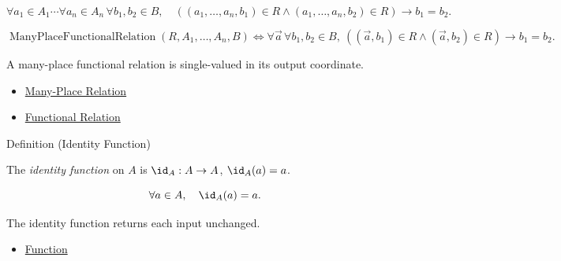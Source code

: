 \begin{remark*}
\[
  \forall a_1\in A_1\cdots\forall a_n\in A_n\,\forall b_1,b_2\in B,\quad
  ((a_1,\ldots,a_n,b_1)\in R\wedge(a_1,\ldots,a_n,b_2)\in R)\to b_1=b_2.
\]
\end{remark*}

\begin{remark*}
\[
  \operatorname{ManyPlaceFunctionalRelation}(R,A_1,\ldots,A_n,B)
  \iff
  \forall \vec a\,\forall b_1,b_2\in B,\
  ((\vec a,b_1)\in R\wedge(\vec a,b_2)\in R)\to b_1=b_2.
\]
\end{remark*}

\begin{remark*}[Interpretation]
A many-place functional relation is single-valued in its output coordinate.
\end{remark*}

\begin{dependencies}
\begin{itemize}
  \item \hyperref[def:many-place-relation]{Many-Place Relation}
  \item \hyperref[def:functional-relation]{Functional Relation}
\end{itemize}
\end{dependencies}

\begin{definitionbox}{Definition (Identity Function)}
\begin{definition}\label{def:identity}
The \emph{identity function} on $A$ is $\id_A : A \to A$, $\id_A(a) = a$.
\end{definition}
\end{definitionbox}

\begin{remark*}
\[
  \forall a\in A,\quad \id_A(a)=a.
\]
\end{remark*}

\begin{remark*}[Interpretation]
The identity function returns each input unchanged.
\end{remark*}

\begin{dependencies}
\begin{itemize}
  \item \hyperref[def:function]{Function}
\end{itemize}
\end{dependencies}

